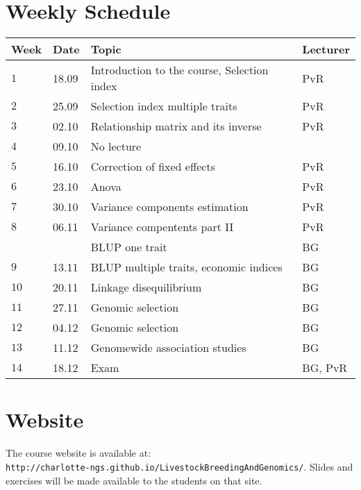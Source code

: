 \documentclass{article}
\begin{document}
\clearpage
\pagebreak

\section*{Weekly Schedule}

\begin{tabular}{|p{1cm}|p{1.5cm}|p{7cm}|p{1.5cm}|}
\hline
Week & Date   & Topic & Lecturer \\
\hline
$1$  & 18.09  & Introduction to the course, Selection index & PvR \\
\hline
$2$  & 25.09  & Selection index multiple traits             & PvR     \\
\hline
$3$  & 02.10  & Relationship matrix and its inverse         & PvR     \\
\hline
$4$  & 09.10  & No lecture & \\
\hline
$5$  & 16.10  & Correction of fixed effects                 & PvR     \\
\hline
$6$  & 23.10  & Anova                                       & PvR     \\
\hline
$7$  & 30.10  & Variance components estimation              & PvR     \\
\hline
$8$  & 06.11  & Variance compentents part II                & PvR     \\
     &        & BLUP one trait                              & BG      \\
\hline
$9$  & 13.11  & BLUP multiple traits, economic indices      & BG      \\
\hline
\hline
$10$ & 20.11  & Linkage disequilibrium                      & BG      \\
\hline
$11$ & 27.11  & Genomic selection                           & BG      \\
\hline
$12$ & 04.12  & Genomic selection                           & BG      \\
\hline
$13$ & 11.12  & Genomewide association studies              & BG      \\
\hline
$14$ & 18.12  & Exam                                        & BG, PvR \\
\hline
\end{tabular}

\section*{Website}
The course website is available at: \\
\verb+http://charlotte-ngs.github.io/LivestockBreedingAndGenomics/+. Slides and exercises will be made available to the students on that site.
\end{document}
